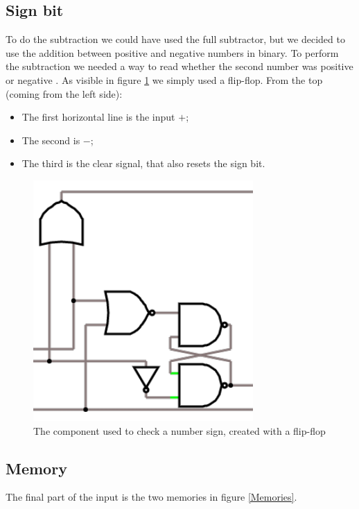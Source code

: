\documentclass{article}
\begin{document}
\subsection{Sign bit}

To do the subtraction we could have used the full subtractor, but we decided to use the addition between positive and negative numbers in binary. To perform the subtraction we needed a way to read whether the second number was positive or negative . As visible in figure \ref{SignBit} we simply used a flip-flop. From the top (coming from the left side):
\begin{itemize}
    \item The first horizontal line is the input $+$;
    \item The second is $-$;
    \item The third is the clear signal, that also resets the sign bit.
\end{itemize}

\begin{figure}[h]
    \centering
    \includegraphics[scale=.5]{IM_SignBit}
    \caption{The component used to check a number sign, created with a flip-flop}
    \label{SignBit}
\end{figure}

\clearpage
\subsection{Memory}
The final part of the input is the two memories in figure \ref{Memories}.
\end{document}

